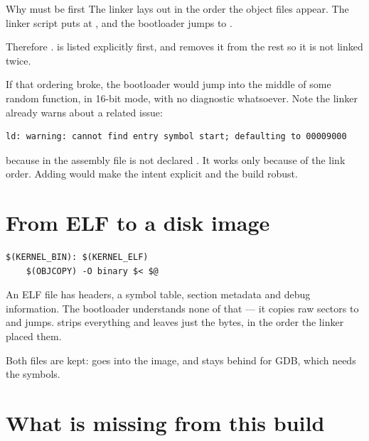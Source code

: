\begin{concept}{Why  must be first}
The linker lays out  in the order the object files appear. The linker script puts
 at , and the bootloader jumps to .

Therefore .
 is listed explicitly first, and  removes it from the
rest so it is not linked twice.

If that ordering broke, the bootloader would jump into the middle of some random function, in 16-bit
mode, with no diagnostic whatsoever. Note the linker already warns about a related issue:
\begin{lstlisting}[style=txt]
ld: warning: cannot find entry symbol start; defaulting to 00009000
\end{lstlisting}
because  in the assembly file is not declared . It works only because of the
link order. Adding  would make the intent explicit and the build robust.
\end{concept}

\section{From ELF to a disk image}

\begin{lstlisting}[style=mk]
$(KERNEL_BIN): $(KERNEL_ELF)
	$(OBJCOPY) -O binary $< $@
\end{lstlisting}

An ELF file has headers, a symbol table, section metadata and debug information. The bootloader
understands none of that --- it copies raw sectors to  and jumps. 
strips everything and leaves just the bytes, in the order the linker placed them.

Both files are kept:  goes into the image, and  stays behind for GDB,
which needs the symbols.

\section{What is missing from this build}

